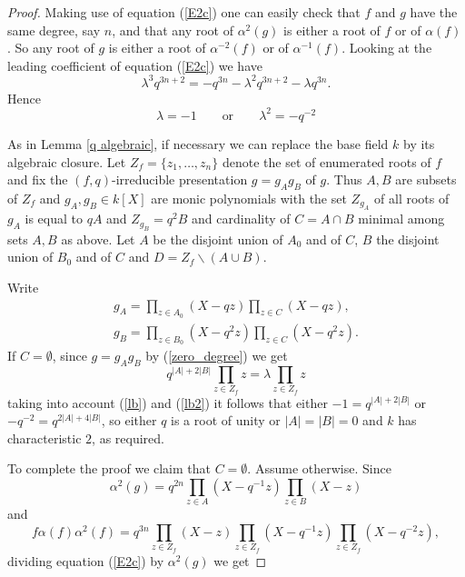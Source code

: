 \documentclass[a4paper, 11pt]{article}
\theoremstyle{definition}
\begin{document}
\begin{proof}
Making use of equation (\ref{E2c}) one can easily check that $f$ and $g$ have the same degree, say $n$, and that any root of $\alpha^2(g)$ is either a root of $f$ or of $\alpha(f)$. So any root of $g$ is either a root of $\alpha^{-2}(f)$ or of $\alpha^{-1}(f)$.  Looking at the leading coefficient of equation (\ref{E2c}) we have
\begin{equation}
\lambda^3q^{3n+2}=-q^{3n}-\lambda^2q^{3n+2}-\lambda q^{3n}.
\end{equation}
Hence
\begin{equation}\label{lb}
\lambda=-1\qquad\mbox{or}\qquad\lambda^2=-q^{-2}
\end{equation}


As in Lemma \ref{q algebraic}, if necessary we can replace the base field $k$ by its algebraic closure. Let $Z_f=\{z_1,\ldots, z_{n}\}$ denote  the set of enumerated roots of $f$ and  fix the $(f,q)$-irreducible presentation $g=g_Ag_B$ of $g$. Thus $A,B$ are  subsets of  $Z_f$ and   $g_A, g_B\in k[X]$ are monic polynomials   with the set $Z_{g_A}$ of all roots of  $g_A$ is equal to $qA$ and $Z_{g_B}=q^{2}B$ and cardinality of  $C=A\cap B$ minimal among sets $A,B$ as above. Let $A$ be the disjoint union of $A_0$ and of $C$, $B$ the disjoint union of $B_0$ and of $C$ and $D=Z_f\backslash (A\cup B)$.

Write
\begin{equation}\label{fAfB}
\begin{split}
g_A=\prod_{z\in A_0}(X-qz)\prod_{z\in C}(X-qz),\\
g_B=\prod_{z\in B_0}(X-q^{2}z)\prod_{z\in C}(X-q^{2}z).
\end{split}
\end{equation}
\noindent If $C=\emptyset$, since $g=g_Ag_B$ by (\ref{zero_degree}) we get
\begin{equation}\label{lb2}
q^{|A|+2|B|}\prod_{z\in {Z_f}} z=\lambda\prod_{z\in Z_f} z
\end{equation}
taking into account (\ref{lb}) and (\ref{lb2}) it follows that either $-1=q^{|A|+2|B|}$ or $-q^{-2}=q^{2|A|+4|B|}$, so either $q$ is a root of unity or $|A|=|B|=0$ and $k$ has characteristic $2$, as required.

To complete the proof we claim that $C=\emptyset$. Assume otherwise. Since
$$\alpha^2(g)=q^{2n}\prod_{z\in A}(X-q^{-1}z)\prod_{z\in B}(X-z)$$
and
$$f\alpha(f)\alpha^2(f)=q^{3n} \prod_{z\in Z_f}(X-z)\prod_{z\in Z_f}(X-q^{-1}z)\prod_{z\in Z_f}(X-q^{-2}z),$$ dividing equation (\ref{E2c}) by $\alpha^2(g)$ we get


\end{proof}
\end{document}
